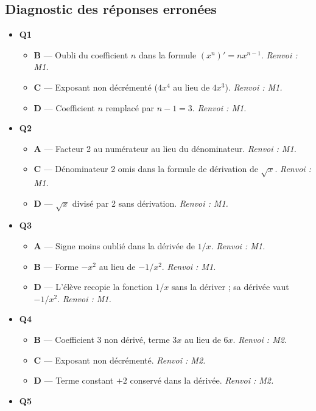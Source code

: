 \subsection*{Diagnostic des réponses erronées}

\begin{itemize}
  \item \textbf{Q1}
  \begin{itemize}
    \item \textbf{B} — Oubli du coefficient $n$ dans la formule $(x^n)' = n x^{n-1}$. \emph{Renvoi : M1.}
    \item \textbf{C} — Exposant non décrémenté ($4x^4$ au lieu de $4x^3$). \emph{Renvoi : M1.}
    \item \textbf{D} — Coefficient $n$ remplacé par $n-1 = 3$. \emph{Renvoi : M1.}
  \end{itemize}
  \item \textbf{Q2}
  \begin{itemize}
    \item \textbf{A} — Facteur 2 au numérateur au lieu du dénominateur. \emph{Renvoi : M1.}
    \item \textbf{C} — Dénominateur 2 omis dans la formule de dérivation de $\sqrt{x}$. \emph{Renvoi : M1.}
    \item \textbf{D} — $\sqrt{x}$ divisé par 2 sans dérivation. \emph{Renvoi : M1.}
  \end{itemize}
  \item \textbf{Q3}
  \begin{itemize}
    \item \textbf{A} — Signe moins oublié dans la dérivée de $1/x$. \emph{Renvoi : M1.}
    \item \textbf{B} — Forme $-x^2$ au lieu de $-1/x^2$. \emph{Renvoi : M1.}
    \item \textbf{D} — L'élève recopie la fonction $1/x$ sans la dériver ; sa dérivée vaut $-1/x^2$. \emph{Renvoi : M1.}
  \end{itemize}
  \item \textbf{Q4}
  \begin{itemize}
    \item \textbf{B} — Coefficient 3 non dérivé, terme $3x$ au lieu de $6x$. \emph{Renvoi : M2.}
    \item \textbf{C} — Exposant non décrémenté. \emph{Renvoi : M2.}
    \item \textbf{D} — Terme constant $+2$ conservé dans la dérivée. \emph{Renvoi : M2.}
  \end{itemize}
  \item \textbf{Q5}

\end{itemize}

